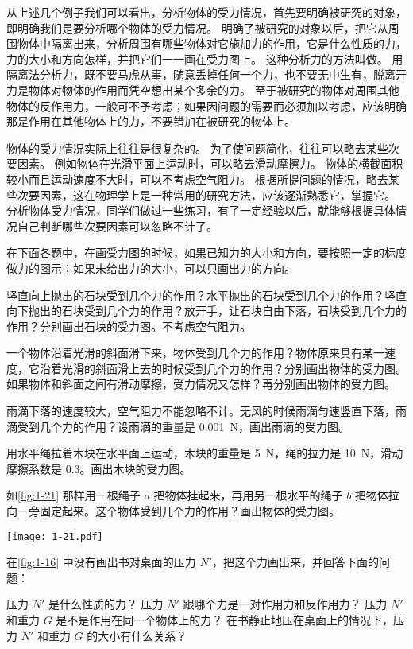 从上述几个例子我们可以看出，分析物体的受力情况，首先要明确被研究的对象，即明确我们是要分析哪个物体的受力情况。
明确了被研究的对象以后，把它从周围物体中隔离出来，分析周围有哪些物体对它施加力的作用，它是什么性质的力，力的大小和方向怎样，并把它们一一画在受力图上。
这种分析力的方法叫做。
用隔离法分析力，既不要马虎从事，随意丢掉任何一个力，也不要无中生有，脱离开力是物体对物体的作用而凭空想出某个多余的力。
至于被研究的物体对周围其他物体的反作用力，一般可不予考虑；如果因问题的需要而必须加以考虑，应该明确那是作用在其他物体上的力，不要错加在被研究的物体上。

物体的受力情况实际上往往是很复杂的。
为了使问题简化，往往可以略去某些次要因素。
例如物体在光滑平面上运动时，可以略去滑动摩擦力。
物体的横截面积较小而且运动速度不大时，可以不考虑空气阻力。
根据所提问题的情况，略去某些次要因素，这在物理学上是一种常用的研究方法，应该逐渐熟悉它，掌握它。
分析物体受力情况，同学们做过一些练习，有了一定经验以后，就能够根据具体情况自己判断哪些次要因素可以忽略不计了。

\begin{Practice}
    在下面各题中，在画受力图的时候，如果已知力的大小和方向，要按照一定的标度做力的图示；如果未给出力的大小，可以只画出力的方向。
\begin{question}
\item 竖直向上抛出的石块受到几个力的作用？水平抛出的石块受到几个力的作用？竖直向下抛出的石块受到几个力的作用？放开手，让石块自由下落，石块受到几个力的作用？分别画出石块的受力图。不考虑空气阻力。
\item 一个物体沿着光滑的斜面滑下来，物体受到几个力的作用？物体原来具有某一速度，它沿着光滑的斜面滑上去的时候受到几个力的作用？分别画出物体的受力图。如果物体和斜面之间有滑动摩擦，受力情况又怎样？再分别画出物体的受力图。
\item 雨滴下落的速度较大，空气阻力不能忽略不计。无风的时候雨滴匀速竖直下落，雨滴受到几个力的作用？设雨滴的重量是 \qty{0.001}{N}，画出雨滴的受力图。
\item 用水平绳拉着木块在水平面上运动，木块的重量是 \qty{5}{N}，绳的拉力是 \qty{10}{N}，滑动摩擦系数是 0.3。画出木块的受力图。
\item 如\cref{fig:1-21} 那样用一根绳子 $a$ 把物体挂起来，再用另一根水平的绳子 $b$ 把物体拉向一旁固定起来。这个物体受到几个力的作用？画出物体的受力图。
\begin{figurehere}
  \begin{minipage}{\linewidth}\centering
    \texttt{[image: 1-21.pdf]}
    \label{fig:1-21}
  \end{minipage}
\end{figurehere}
\item  在\cref{fig:1-16} 中没有画出书对桌面的压力 $N'$，把这个力画出来，并回答下面的问题：
\begin{tasks}
  \task 压力 $N'$ 是什么性质的力？
  \task 压力 $N'$ 跟哪个力是一对作用力和反作用力？
  \task 压力 $N'$ 和重力 $G$ 是不是作用在同一个物体上的力？
  \task 在书静止地压在桌面上的情况下，压力 $N'$ 和重力 $G$ 的大小有什么关系？
\end{tasks}
\end{question}
\end{Practice}

